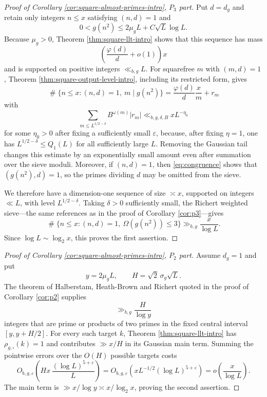 \documentclass[11pt,reqno]{amsart}
\theoremstyle{plain}
\theoremstyle{definition}
\newcommand{\eps}{\varepsilon}
\newcommand{\1}{\mathbf 1}
\DeclareMathOperator{\Card}{\#}
\begin{document}
\begin{proof}[Proof of Corollary \ref{cor:square-almost-primes-intro}, $P_3$ part]
Put $d=d_g$ and retain only integers $n\le x$ satisfying $(n,d)=1$ and
\[
 0<g(n^2)\le 2\mu_gL+C\sqrt L\log L.
\]
Because $\mu_g>0$, Theorem \ref{thm:square-llt-intro} shows that this sequence has mass
\[
 \left(\frac{\varphi(d)}d+o(1)\right)x
\]
and is supported on positive integers $\ll_{b,g}L$.  For squarefree $m$ with $(m,d)=1$, Theorem \ref{thm:square-output-level-intro}, including its restricted form, gives
\[
 \Card\{n\le x:(n,d)=1,\ m\mid g(n^2)\}
 =\frac{\varphi(d)}d\frac{x}{m}+r_m
\]
with
\[
 \sum_{m\le L^{1/2-\delta}}B^{\omega(m)}|r_m|
 \ll_{b,g,\delta,B}xL^{-\eta_0}
\]
for some $\eta_0>0$ after fixing a sufficiently small $\eps$, because, after fixing $\eta=1$, one has $L^{1/2-\delta}\le Q_1(L)$ for all sufficiently large $L$.  Removing the Gaussian tail changes this estimate by an exponentially small amount even after summation over the sieve moduli.  Moreover, if $(n,d)=1$, then \eqref{eq:congruence} shows that $(g(n^2),d)=1$, so the primes dividing $d$ may be omitted from the sieve.

We therefore have a dimension-one sequence of size $\asymp x$, supported on integers $\ll L$, with level $L^{1/2-\delta}$.  Taking $\delta>0$ sufficiently small, the Richert weighted sieve---the same references as in the proof of Corollary \ref{cor:p3}---gives
\[
 \Card\{n\le x:(n,d)=1,\ \Omega(g(n^2))\le3\}
 \gg_{b,g}\frac{x}{\log L}.
\]
Since $\log L\sim\log_2x$, this proves the first assertion.
\end{proof}

\begin{proof}[Proof of Corollary \ref{cor:square-almost-primes-intro}, $P_2$ part]
Assume $d_g=1$ and put
\[
 y=2\mu_gL,\qquad H=\sqrt2\,\sigma_g\sqrt L.
\]
The theorem of Halberstam, Heath-Brown and Richert \cite{hhbr} quoted in the proof of Corollary \ref{cor:p2} supplies
\[
 \gg_{b,g}\frac{H}{\log y}
\]
integers that are prime or products of two primes in the fixed central interval $[y,y+H/2]$.  For every such target $k$, Theorem \ref{thm:square-llt-intro} has $\rho_{g,\square}(k)=1$ and contributes $\gg x/H$ in its Gaussian main term.  Summing the pointwise errors over the $O(H)$ possible targets costs
\[
 O_{b,g,\eps}\!\left(
 Hx\,\frac{(\log L)^{5+\eps}}L\right)
 =O_{b,g,\eps}\!\left(xL^{-1/2}(\log L)^{5+\eps}\right)
 =o\!\left(\frac{x}{\log L}\right).
\]
The main term is $\gg x/\log y\asymp x/\log_2x$, proving the second assertion.
\end{proof}
\end{document}
